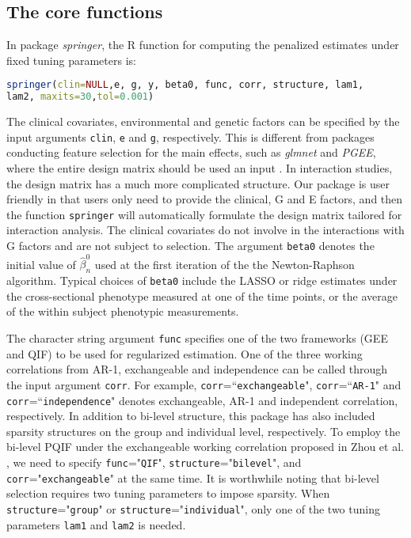 \documentclass[12pt]{article}
\begin{document}
\subsection{The core functions}

In package \emph{springer}, the R function for computing the penalized estimates under fixed tuning parameters is: 

\begin{lstlisting}[language=R]
springer(clin=NULL,e, g, y, beta0, func, corr, structure, lam1, 
lam2, maxits=30,tol=0.001)
\end{lstlisting}

The clinical covariates, environmental and genetic factors can be specified by the input arguments \texttt{clin}, \texttt{e} and \texttt{g}, respectively. This is different from packages conducting feature selection for the main effects, such as \emph{glmnet} and \emph{PGEE}, where the entire design matrix should be used an input \cite{FHT,inan2017pgee}. In interaction studies, the design matrix has a much more complicated structure. Our package is user friendly in that users only need to provide the clinical, G and E factors, and then the function \texttt{springer} will automatically formulate the design matrix tailored for interaction analysis. The clinical covariates do not involve in the interactions with G factors and are not subject to selection. The argument \texttt{beta0} denotes the initial value of $\hat{\beta}_n^{0}$ used at the first iteration of the the Newton-Raphson algorithm. {\color{blue} Typical choices of \texttt{beta0} include the LASSO or ridge estimates under the cross-sectional phenotype measured at one of the time points, or the average of the within subject phenotypic measurements. }   

The character string argument \texttt{func} specifies one of the two frameworks (GEE and QIF) to be used for regularized estimation. One of the three working correlations from AR-1, exchangeable and independence can be called through the input argument \texttt{corr}. For example, \texttt{corr}=``\texttt{exchangeable}", \texttt{corr}=``\texttt{AR-1}" and \texttt{corr}=``\texttt{independence}" denotes exchangeable, AR-1 and independent correlation, respectively. In addition to bi-level structure, this package has also included sparsity structures on the group and individual level, respectively. To employ the bi-level PQIF under the exchangeable working correlation proposed in Zhou et al. \cite{zhou2022sparse}, we need to specify \texttt{func}="\texttt{QIF}", \texttt{structure}="\texttt{bilevel}", and \texttt{corr}="\texttt{exchangeable}" at the same time. It is worthwhile noting that bi-level selection requires two tuning parameters to impose sparsity. When \texttt{structure}="\texttt{group}" or \texttt{structure}="\texttt{individual}", only one of the two tuning parameters \texttt{lam1} and \texttt{lam2} is needed. 
\end{document}
